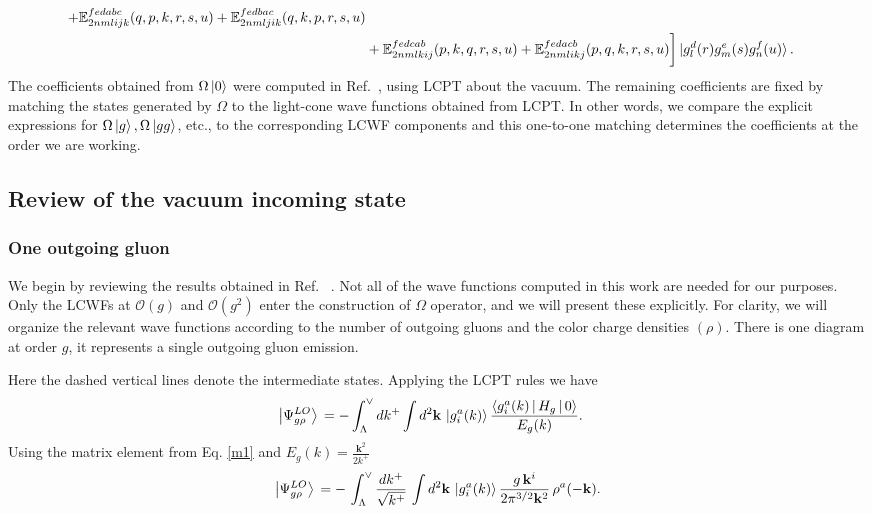 \documentclass[a4paper,11pt]{article}
\def\v#1{\mathbf{#1}}
\def\mf#1{\mathbb{#1}}
\begin{document}
\begin{align}
+\mf{E}^{fedabc}_{2nmlijk}(q,p,k,r,s,u)+\mf{E}^{fedbac}_{2nmljik}(q,k,p,r,s,u)\notag \\ & +\mf{E}^{fedcab}_{2nmlkij}(p,k,q,r,s,u) +\mf{E}^{fedacb}_{2nmlikj}(p,q,k,r,s,u)\bigg]\ket{g^{d}_{l}(r)g^{e}_{m}(s)g^{f}_{n}(u)}.
\end{align}
The coefficients obtained from $\Omega\ket{0}$ were computed in Ref.~\cite{Lublinsky:2016meo}, using LCPT about the vacuum. The remaining coefficients are fixed by matching the states generated by $\Omega$ to the light-cone wave functions obtained from LCPT. In other words, we compare the explicit expressions for $\Omega\ket{g}, \Omega\ket{gg}$, etc., to the corresponding LCWF components and this one-to-one matching determines the coefficients at the order we are working.

\subsection{Review of the vacuum incoming state}\label{sec:vac}
\subsubsection{One outgoing gluon}
We begin by reviewing the results obtained in Ref. ~\cite{Lublinsky:2016meo}. Not all of the wave functions computed in this work are needed for our purposes. Only the LCWFs at $\mathcal{O}(g)$ and $\mathcal{O}(g^{2})$ enter the construction of $\Omega$ operator, and we will present these explicitly. For clarity, we will organize the relevant wave functions according to the number of outgoing gluons and the color charge densities $(\rho)$. There is one diagram at order $g$, it represents a single outgoing gluon emission. 

\begin{figure}[htbp]
\centering
\end{figure}
Here the dashed vertical lines denote the intermediate states. Applying the LCPT rules we have
\begin{align}
    \left|\Psi_{g\rho}^{LO}\right\rangle \, & =\- -\int_{\Lambda}^{\vee} dk^{+} \int d^{2}\mathbf{k}\, \ket{g^{a}_{i}(k)}\frac{\left\langle g_{i}^{a}(k)\left|\, H_{g}\,\right|0\right\rangle}{E_{g}(k)}.
\end{align}
Using the matrix element from Eq. \eqref{m1} and $E_{g}(k) = \frac{\v{k}^{2}}{2k^{+}}$
\begin{equation}
\left|\Psi_{g\rho}^{LO}\right\rangle \,=\- -\,\int_{\Lambda}^{\vee}\frac{dk^{+}}{\sqrt{k^{+}}}\,\int d^{2}\mathbf{k}\,\left|g_{i}^{a}(k)\right\rangle\frac{g\, \mathbf{k}^{i}}{2\pi^{3/2}\mathbf{k}^{2}}\,\rho^{a}(-\mathbf{k}).
\end{equation}
\end{document}
